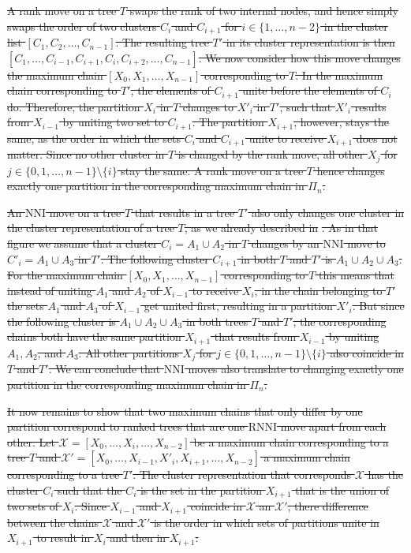 \documentclass[11pt]{amsart}
\newcommand{\rnni}{\mathrm{RNNI}}
\newcommand{\nni}{\mathrm{NNI}}
\providecommand{\DIFdeltex}[1]{{\protect\color{red}\sout{#1}}}                      %
\providecommand{\DIFdel}[1]{\texorpdfstring{\DIFdeltex{#1}}{}} %
\begin{document}
\DIFdel{A rank move on a tree $T$ swaps the rank of two internal nodes, and hence simply swaps the order of two clusters $C_i$ and $C_{i+1}$ for $i \in \{1, \ldots, n-2\}$ in the cluster list $[C_1, C_2, \ldots, C_{n-1}]$.
	The resulting tree $T'$ in its cluster representation is then $[C_1, \ldots, C_{i-1}, C_{i+1}, C_i, C_{i+2}, \ldots, C_{n-1}]$.
	We now consider how this move changes the maximum chain $[X_0, X_1, \ldots, X_{n-1}]$ corresponding to $T$.
	In the maximum chain corresponding to $T'$, the elements of $C_{i+1}$ unite before the elements of $C_i$ do.
	Therefore, the partition $X_{i}$ in $T$ changes to $X'_i$ in $T'$, such that $X'_i$ results from $X_{i-1}$ by uniting two set to $C_{i+1}$.
	The partition $X_{i+1}$, however, stays the same, as the order in which the sets $C_i$ and $C_{i+1}$ unite to receive $X_{i+1}$ does not matter.
	Since no other cluster in $T$ is changed by the rank move, all other $X_j$ for $j \in \{0,1,\ldots,n-1\}\setminus\{i\}$ stay the same.
	A rank move on a tree $T$ hence changes exactly one partition in the corresponding maximum chain in $\Pi_n$.
}%

\DIFdel{An $\nni$ move on a tree $T$ that results in a tree $T'$ also only changes one cluster in the cluster representation of a tree $T$, as we already described in }%
\DIFdel{.
	As in that figure we assume that a cluster $C_i = A_1 \cup A_2$ in $T$ changes by an $\nni$ move to $C'_i = A_1 \cup A_3$ in $T'$.
	The following cluster $C_{i+1}$ in both $T$ and $T'$ is $A_1 \cup A_2 \cup A_3$.
	For the maximum chain $[X_0, X_1, \ldots, X_{n-1}]$ corresponding to $T$ this means that instead of uniting $A_1$ and $A_2$ of $X_{i-1}$ to receive $X_i$, in the chain belonging to $T'$ the sets $A_1$ and $A_3$ of $X_{i-1}$ get united first, resulting in a partition $X'_i$.
	But since the following cluster is $A_1 \cup A_2 \cup A_3$ in both trees $T$ and $T'$, the corresponding chains both have the same partition $X_{i+1}$ that results from $X_{i-1}$ by uniting $A_1, A_2$, and $A_3$.
	All other partitions $X_j$ for $j \in \{0,1,\ldots,n-1\}\setminus\{i\}$ also coincide in $T$ and $T'$.
	We can conclude that $\nni$ moves also translate to changing exactly one partition in the corresponding maximum chain in $\Pi_n$.
}%

\DIFdel{It now remains to show that two maximum chains that only differ by one partition correspond to ranked trees that are one $\rnni$ move apart from each other.
	Let $\mathcal X = [X_0, \ldots, X_i, \ldots, X_{n-2}]$ be a maximum chain corresponding to a tree $T$ and $\mathcal X' = [X_0, \ldots, X_{i-1}, X'_i, X_{i+1}, \ldots, X_{n-2}]$ a maximum chain corresponding to a tree $T'$.
	The cluster representation that corresponds $\mathcal X$ has the cluster $C_i$ such that the $C_i$ is the set in the partition $X_{i+1}$ that is the union of two sets of $X_i$.
	Since $X_{i-1}$ and $X_{i+1}$ coincide in $\mathcal X$ an $\mathcal X'$, there difference between the chains $\mathcal X$ and $\mathcal X'$ is the order in which sets of partitions unite in $X_{i+1}$ to result in $X_i$ and then in $X_{i+1}$:
}%
\end{document}
